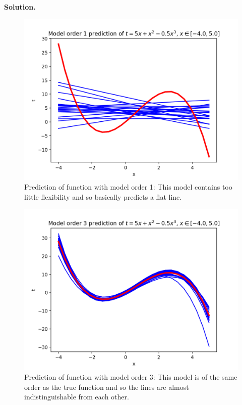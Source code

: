 \documentclass[10pt]{article}
\begin{document}
\begin{itemize}
{\bf Solution.} 

\begin{figure}[H]
\centering
  \includegraphics[width=\linewidth]{model_bias-1.png}
 \caption{Prediction of function with model order 1: This model contains too little flexibility and so basically predicts a flat line.}
\label{label}
\end{figure}

\begin{figure}[H]
\centering
  \includegraphics[width=\linewidth]{model_bias-3.png}
 \caption{Prediction of function with model order 3: This model is of the same order as the true function and so the lines are almost indistinguishable from each other.}
\label{label}
\end{figure}


\end{itemize}
\end{document}
